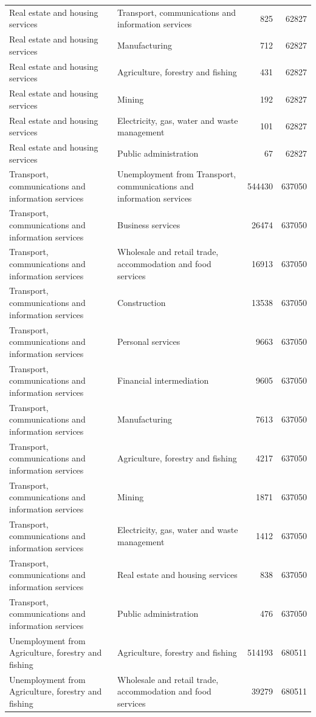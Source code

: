 \begin{longtable}{llrr}
Real estate and housing services & Transport, communications and information services & 825 & 62827 \\
Real estate and housing services & Manufacturing & 712 & 62827 \\
Real estate and housing services & Agriculture, forestry and fishing & 431 & 62827 \\
Real estate and housing services & Mining & 192 & 62827 \\
Real estate and housing services & Electricity, gas, water and waste management & 101 & 62827 \\
Real estate and housing services & Public administration & 67 & 62827 \\
Transport, communications and information services & Unemployment from Transport, communications and information services & 544430 & 637050 \\
Transport, communications and information services & Business services & 26474 & 637050 \\
Transport, communications and information services & Wholesale and retail trade, accommodation and food services & 16913 & 637050 \\
Transport, communications and information services & Construction & 13538 & 637050 \\
Transport, communications and information services & Personal services & 9663 & 637050 \\
Transport, communications and information services & Financial intermediation & 9605 & 637050 \\
Transport, communications and information services & Manufacturing & 7613 & 637050 \\
Transport, communications and information services & Agriculture, forestry and fishing & 4217 & 637050 \\
Transport, communications and information services & Mining & 1871 & 637050 \\
Transport, communications and information services & Electricity, gas, water and waste management & 1412 & 637050 \\
Transport, communications and information services & Real estate and housing services & 838 & 637050 \\
Transport, communications and information services & Public administration & 476 & 637050 \\
Unemployment from Agriculture, forestry and fishing & Agriculture, forestry and fishing & 514193 & 680511 \\
Unemployment from Agriculture, forestry and fishing & Wholesale and retail trade, accommodation and food services & 39279 & 680511 \\

\end{longtable}
